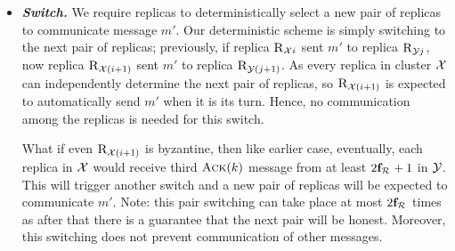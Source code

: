 \begin{itemize}[wide]
\item {\bf \em Switch.}
We require replicas to deterministically select a new pair of replicas to communicate message $m'$. 
Our deterministic scheme is simply switching to the next pair of replicas; 
previously, if replica $\textsc{R}_{{\mathcal{X}}{i}}$ sent $m'$ to replica $\textsc{R}_{{\mathcal{Y}}{j}}$, now 
replica $\textsc{R}_{{\mathcal{X}}{(i+1)}}$ sent $m'$ to replica $\textsc{R}_{{\mathcal{Y}}{(j+1)}}$.
As every replica in cluster $\mathcal{X}$ can independently determine the next pair of replicas, 
so $\textsc{R}_{{\mathcal{X}}{(i+1)}}$ is expected to automatically send $m'$ when it is its turn. 
Hence, no communication among the replicas is needed for this switch.

What if even $\textsc{R}_{{\mathcal{X}}{(i+1)}}$ is byzantine, then like earlier case, eventually, 
each replica in $\mathcal{X}$ would receive third $\textsc{Ack}(k)$ message from at least $2\textbf{f}_{\mathcal{R}_{\mathcal{}}}+1$ in $\mathcal{Y}$. 
This will trigger another switch and a new pair of replicas will be expected to communicate $m'$.
Note: this pair switching can take place at most $2\textbf{f}_{\mathcal{R}_{\mathcal{}}}$ times as after that there is 
a guarantee that the next pair will be honest.
Moreover, this switching does not prevent communication of other messages.



\end{itemize}
